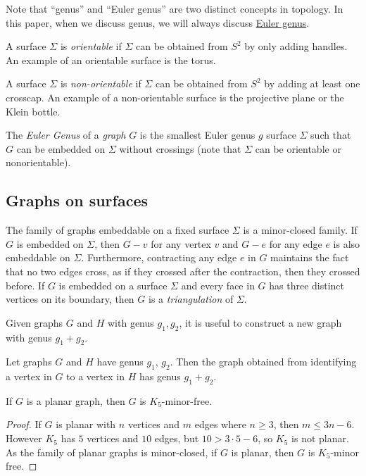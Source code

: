 Note that ``genus'' and ``Euler genus'' are two distinct concepts in topology. In this paper, when we discuss genus, we will always discuss \underline{Euler genus}.

A surface \(\Sigma\) is \textit{orientable} if \(\Sigma\) can be obtained from \(S^2\) by only adding handles. An example of an orientable surface is the torus.

A surface \(\Sigma\) is \textit{non-orientable} if \(\Sigma\) can be obtained from \(S^2\) by adding at least one crosscap. An example of a non-orientable surface is the projective plane or the Klein bottle. 

The \textit{Euler Genus} of a \textit{graph} \(G\) is the smallest Euler genus \(g\) surface \(\Sigma\) such that \(G\) can be embedded on \(\Sigma\) without crossings (note that \(\Sigma\) can be orientable or nonorientable). 


\subsection{Graphs on surfaces}
The family of graphs embeddable on a fixed surface $\Sigma$ is a minor-closed family. If $G$ is embedded on $\Sigma$, then $G - v$ for any vertex $v$ and $G - e$ for any edge $e$ is also embeddable on $\Sigma$. Furthermore, contracting any edge $e$ in $G$ maintains the fact that no two edges cross, as if they crossed after the contraction, then they crossed before. 
If $G$ is embedded on a surface $\Sigma$ and every face in $G$ has three distinct vertices on its boundary, then $G$ is a \textit{triangulation} of $\Sigma$. 

Given graphs $G$ and $H$ with genus $g_1, g_2$, it is useful to construct a new graph with genus $g_1 + g_2$. 
\begin{theorem}\label{thm:additivity_genus}
	Let graphs $G$ and $H$ have genus $g_1$, $g_2$. Then the graph obtained from identifying a vertex in $G$ to a vertex in $H$ has genus $g_1 + g_2$. 
\end{theorem}

\begin{lemma}\label{thm:K5_Free_Planar}
	If \(G\) is a planar graph, then \(G\) is \(K_5\)-minor-free.
\end{lemma}
\begin{proof}
	If \(G\) is planar with \(n\) vertices and \(m\) edges where $n \geq 3$, then \(m \leq 3n -6\).
	However \(K_5\) has \(5\) vertices and \(10\) edges, but  \( 10 > 3 \cdot 5 - 6\), so \(K_5\) is not planar. As the family of planar graphs is minor-closed, if \(G\) is planar, then $G$ is \(K_5\)-minor free.
\end{proof}

